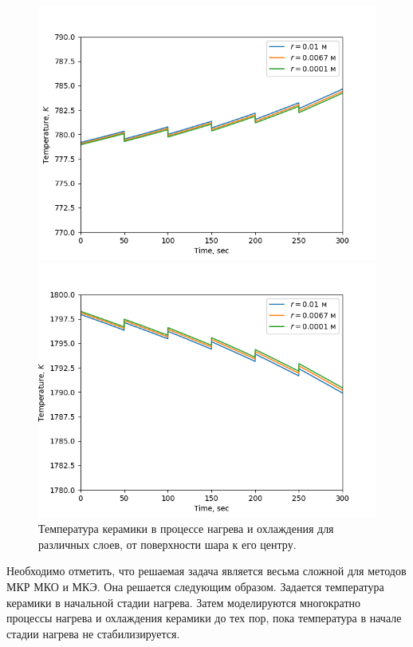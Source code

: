 \documentclass[a4paper,11pt,numreferences,mathsec,kaplist]{isuepsutf8}
\begin{document}
\begin{article}
\begin{figure}[ht]
    \caption {Температура керамики в процессе нагрева и охлаждения для
    различных слоев, от поверхности шара к его центру.}
    \label{fig:img2}
    \begin{minipage}[t]{0.49\textwidth}
        \centering
        \includegraphics[width=\textwidth]{img3}
    \end{minipage}
    \hfill
    \begin{minipage}[t]{0.49\textwidth}
        \centering
        \includegraphics[width=\textwidth]{img4}
    \end{minipage}
\end{figure}

Необходимо отметить, что решаемая задача является весьма сложной для
методов МКР МКО и МКЭ. Она решается следующим образом. Задается
температура керамики в начальной стадии нагрева. Затем моделируются
многократно процессы нагрева и охлаждения керамики до тех пор, пока
температура в начале стадии нагрева не стабилизируется. 


\end{article}
\end{document}
